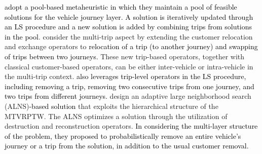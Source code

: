 \documentclass[11pt]{article}
\newcommand\add[1]{\textcolor{black}{#1}}
\begin{document}
\cite{wang2014metaheuristic} \add{adopt a pool-based metaheuristic in which they maintain a pool of feasible solutions for the vehicle journey layer.  A solution is iteratively updated through an LS procedure and a new solution is added by combining trips from solutions in the pool}. %
\cite{cattaruzza2016multi} consider the multi-trip aspect by extending the customer relocation and exchange operators to \add{relocation of a trip (to another journey) and swapping of trips between two journeys.}  These new trip-based operators, together with classical customer-based operators, can be either inter-vehicle or intra-vehicle in the multi-trip context.  
\add{\cite{pan2021multi} also leverages trip-level operators in the LS procedure, including removing a trip, removing two consecutive trips from one journey, and two trips from different journeys.}  %
\cite{azi2014adaptive} design an adaptive large neighborhood search (ALNS)\add{-based solution} that exploits the hierarchical structure of the MTVRPTW.  The ALNS optimizes a solution through the utilization of destruction and reconstruction operators. %
\add{In considering the multi-layer structure of the problem, they proposed to probabilistically remove an entire vehicle's journey or a trip from the solution, in addition to the usual customer removal.}
\newline
\end{document}
